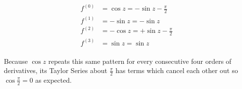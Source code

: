 \documentclass[11pt]{article}
\begin{document}
\begin{enumerate}
	\[
	\begin{aligned}
		f^{(0)} &= \cos{z} = -\sin{z - \frac{\pi}{2}} \\
		f^{(1)} &= -\sin{z} = -\sin{z} \\
		f^{(2)} &= -\cos{z} = +\sin{z - \frac{\pi}{2}} \\
		f^{(3)} &= \sin{z} = \sin{z} \\
	\end{aligned}
	\]
	
	Because $\cos{z}$ repeats this same pattern for every consecutive four orders of derivatives, its Taylor Series about $\frac{\pi}{2}$ has terms which cancel each other out so $\cos{\frac{\pi}{2}} = 0$ as expected.
	
\end{enumerate}
\end{document}
